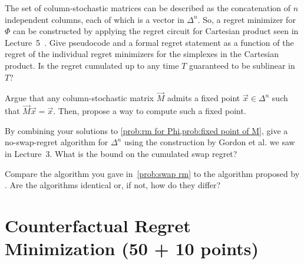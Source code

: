 \documentclass{homework}
\begin{document}
\begin{problem}[10 points]\label{prob:rm for Phi}
    The set of column-stochastic matrices can be described as the concatenation of $n$ independent columns, each of which is a vector in $\Delta^n$. So, a regret minimizer for $\Phi$ can be constructed by applying the regret circuit for Cartesian product seen in Lecture~5~\citep{Farina19:Regret}. Give pseudocode and a formal regret statement as a function of the regret of the individual regret minimizers for the simplexes in the Cartesian product. Is the regret cumulated up to any time $T$ guaranteed to be sublinear in $T$?
\end{problem}
\begin{solution}
\end{solution}

\begin{problem}[7 points]\label{prob:fixed point of M}
    Argue that any column-stochastic matrix $\vec{M}$ admits a fixed point $\vec{x} \in \Delta^n$ such that $\vec{M}\vec{x} = \vec{x}$. Then, propose a way to compute such a fixed point.
\end{problem}
\begin{solution}
\end{solution}

\begin{problem}[6 points]\label{prob:swap rm}
    By combining your solutions to \cref{prob:rm for Phi,prob:fixed point of M}, give a no-swap-regret algorithm for $\Delta^n$ using the construction by Gordon et al. we saw in Lecture~3. What is the bound on the cumulated swap regret? 
\end{problem}
\begin{solution}
\end{solution}

\begin{problem}
    Compare the algorithm you gave in~\cref{prob:swap rm} to the algorithm proposed by \citet{Blum07:From}. Are the algorithms identical or, if not, how do they differ?
\end{problem}
\begin{solution}
\end{solution}

\section{Counterfactual Regret Minimization (50 + 10 points)}
\end{document}
